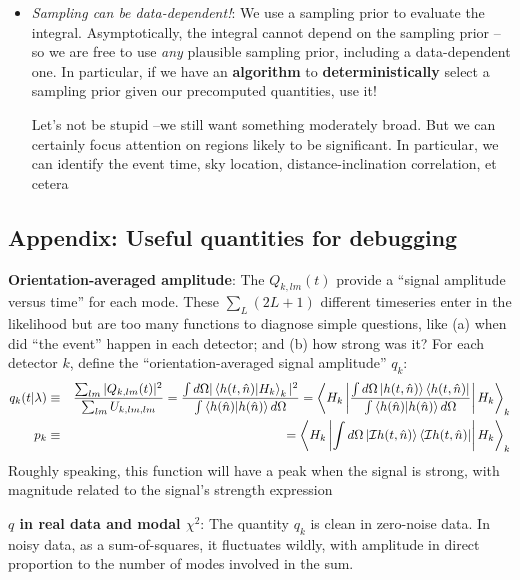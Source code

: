 \documentclass[twocolumn,prd,nofootinbib]{revtex4}
\newcommand\editremark[1]{{\color{red} #1}}
\newcommand\qmstate[1]{\left|#1\right \rangle}
\newcommand\qmstateKet[1]{\left\langle#1\right|}
\newcommand\qmstateproduct[2]{\left\langle#1|#2\right\rangle}
\newcommand\qmoperatorelement[3]{\left\langle#1\left|#2\right|#3\right\rangle}
\begin{document}
\begin{widetext}
\begin{shaded}
\begin{itemize}
\item \emph{Sampling can be data-dependent!}: We use a sampling prior to evaluate the integral.  Asymptotically, the
  integral cannot depend on the sampling prior -- so we are free to use \emph{any} plausible sampling prior, including a
  data-dependent one.  In particular, if we have an \textbf{algorithm} to \textbf{deterministically} select a sampling
  prior given our precomputed quantities, use it!

Let's not be stupid --we still want something moderately broad.  But we can certainly focus attention on regions likely
to be significant.  In particular, we can identify the event time, sky location, distance-inclination correlation, et cetera
\end{itemize}
\end{shaded}

\subsection{Appendix: Useful quantities for debugging}

\noindent \textbf{Orientation-averaged amplitude}: The $Q_{k,lm}(t)$ provide a ``signal amplitude versus time'' for each
mode.  These  $\sum_L(2L+1)$ different timeseries enter in the likelihood but are too many functions to diagnose simple
questions, like (a) when did ``the event'' happen in each detector; and (b) how strong  was it?  
%
For each detector $k$, define the  ``orientation-averaged signal amplitude'' $q_k$:
\begin{eqnarray}
q_k(t|\lambda) &\equiv& \frac{\sum_{lm} |Q_{k,lm}(t)|^2}{\sum_{lm}U_{k,lm,lm}} 
 = \frac{\int d\Omega  |\qmstateproduct{h(t,\hat{n})}{H_k}_k|^2}{\int \qmstateproduct{h(\hat{n})}{h(\hat{n})} d\Omega}
= \qmoperatorelement{H_k}{\frac{\int d\Omega \qmstate{h(t,\hat{n})}\qmstateKet{h(t,\hat{n})}}{
\int \qmstateproduct{h(\hat{n})}{h(\hat{n})} d\Omega
}}{H_k}_k \\
p_k &\equiv & = \qmoperatorelement{H_k}{\int d\Omega \qmstate{{\cal I} h(t,\hat{n})}\qmstateKet{{\cal I}  h(t,\hat{n})}}{H_k}_k \\
\end{eqnarray}
Roughly speaking, this function will have a peak when the signal is strong, with magnitude related to the signal's
strength \editremark{expression}

\begin{shaded}
\noindent \textbf{$q$ in real data and modal $\chi^2$}: The quantity $q_k$ is clean in zero-noise data.  In noisy data,
as  a sum-of-squares, it  fluctuates wildly, with amplitude in direct proportion to the number of modes involved
in the sum.


\end{shaded}
\end{widetext}
\end{document}
